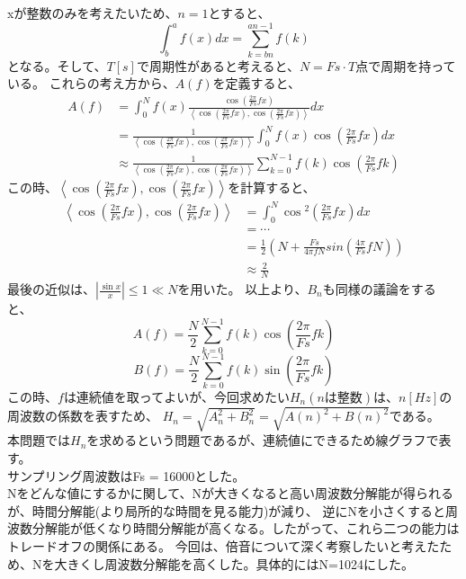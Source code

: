 \documentclass[a4j,11pt]{jarticle}
\begin{document}
    xが整数のみを考えたいため、$n = 1$とすると、
    $$\int _b ^a f(x) dx = \sum _{k = bn} ^{an-1} f(k)$$
    となる。そして、$T[s]$で周期性があると考えると、$N = Fs \cdot T$点で周期を持っている。
    これらの考え方から、$A(f)$を定義すると、
    \begin{align}
        A(f) &= \int _0 ^N f(x) \frac {\cos{ \left( \frac {2\pi} {Fs} f x \right)}} {\left< \cos{ \left( \frac {2\pi} {Fs} f x \right)}, \cos{ \left( \frac {2\pi} {Fs} f x \right)} \right>} dx \\
        &= \frac 1 {\left< \cos{ \left( \frac {2\pi} {Fs} f x \right)}, \cos{ \left( \frac {2\pi} {Fs} f x \right)} \right>} \int _0 ^N f(x) \cos{ \left( \frac {2\pi} {Fs} f x \right)}  dx\\
        &\approx \frac 1 {\left< \cos{ \left( \frac {2\pi} {Fs} f x \right)}, \cos{ \left( \frac {2\pi} {Fs} f x \right)} \right>} \sum _{k = 0} ^{ N -1 } f(k) \cos{ \left( \frac {2\pi} {Fs} f k \right)}
    \end{align}
    この時、$\left< \cos{ \left( \frac {2\pi} {Fs} f x \right)}, \cos{ \left( \frac {2\pi} {Fs} f x \right)} \right>$を計算すると、
    \begin{align}
        \left< \cos{ \left( \frac {2\pi} {Fs} f x \right)}, \cos{ \left( \frac {2\pi} {Fs} f x \right)} \right>
        &= \int _0 ^N \cos{ ^2 \left( \frac {2\pi} {Fs} f x \right)} dx\\
        &= \cdots\\
        &= \frac 1 2 (N + \frac {Fs} {4\pi f N}sin(\frac {4\pi} {Fs} f N ))\\
        &\approx \frac 2 N
    \end{align}
    最後の近似は、$\left| \frac {\sin x} x \right| \leq 1 \ll N$を用いた。
    以上より、$B_n$も同様の議論をすると、
    $$A(f) =  \frac N 2 \sum _{k = 0} ^{ N -1 } f(k) \cos{ \left( \frac {2\pi} {Fs} f k \right)}$$
    $$B(f) =  \frac N 2 \sum _{k = 0} ^{ N -1 } f(k) \sin{ \left( \frac {2\pi} {Fs} f k \right)}$$
    この時、$f$は連続値を取ってよいが、今回求めたい$H_n(nは整数)$は、$n[Hz]$の周波数の係数を表すため、
    $H_n = \sqrt{A_n ^2 + B_n^2} = \sqrt{A(n) ^2 + B(n)^2}$である。\\
    本問題では$H_n$を求めるという問題であるが、連続値にできるため線グラフで表す。\\

    サンプリング周波数はFs = 16000とした。\\
    Nをどんな値にするかに関して、Nが大きくなると高い周波数分解能が得られるが、時間分解能(より局所的な時間を見る能力)が減り、
    逆にNを小さくすると周波数分解能が低くなり時間分解能が高くなる。したがって、これら二つの能力はトレードオフの関係にある。
    今回は、倍音について深く考察したいと考えたため、Nを大きくし周波数分解能を高くした。具体的にはN=1024にした。
\end{document}
